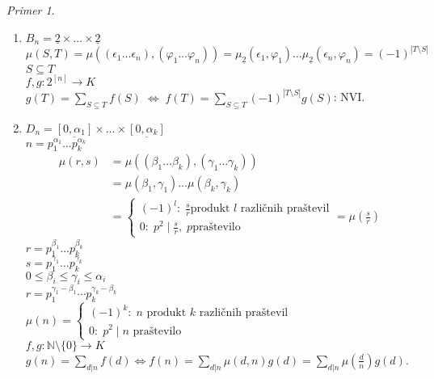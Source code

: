 \documentclass[a4paper, 12pt]{book}
\theoremstyle{definition}
\theoremstyle{remark}
\newtheorem*{ex}{Primer}
\newcommand{\N}{\mathbb{N}}
\begin{document}
\begin{ex} \text{}
  \begin{enumerate}[label=(\arabic*)]
    \item $B_n = \underline{2} \times \dots \times \underline{2}$ \\
      $\mu(S, T) = \mu((\epsilon_1 \dots \epsilon_n), (\varphi_1 \dots \varphi_n))
        = \mu_{\underline{2}}(\epsilon_1, \varphi_1) \dots \mu_{\underline{2}}(\epsilon_n, \varphi_n)
        = (-1)^{|T \setminus S|}$ \\
      $S \subseteq T$ \\
      $f, g: 2^{[n]} \to K$ \\
      $g(T) = \sum_{S \subseteq T} f(S) \; \iff \;
      f(T) = \sum_{S \subseteq T} (-1)^{|T \setminus S|} g(S)$: NVI.
    \item $D_n = \underline{[0, \alpha_1]} \times \dots \times \underline{[0, \alpha_k]}$ \\
      $n = p_1^{\alpha_1} \dots p_k^{\alpha_k}$
      \begin{align*}
        \mu(r,s) &= \mu((\beta_1 \dots \beta_k), (\gamma_1 \dots \gamma_k)) \\
        &= \mu(\beta_1, \gamma_1) \dots \mu(\beta_k, \gamma_k) \\
        &= \begin{cases}
          (-1)^l: \; \frac{s}{r} \text{produkt $l$ različnih praštevil} \\
          0: \; p^2 \mid \frac{s}{r}, \; p \text{praštevilo}
        \end{cases} = \mu\left(\frac{s}{r}\right)
      \end{align*}
      $r = p_1^{\beta_1} \dots p_k^{\beta_k}$ \\
      $s = p_1^{\gamma_1} \dots p_k^{\gamma_k}$ \\
      $0 \leq \beta_i \leq \gamma_i \leq \alpha_i$ \\
      $r = p_1^{\gamma_1 - \beta_1} \cdots p_k^{\gamma_k - \beta_k}$ \\
      $\mu(n) = \begin{cases}
        (-1)^k: \; n \text{ produkt $k$ različnih praštevil} \\
        0: \; p^2 \mid n \text{ praštevilo}
      \end{cases}$ \\
      $f, g: \N \setminus \{0\} \to K$ \\
      $g(n) = \sum_{d | n} f(d) \iff
      f(n) = \sum_{d | n} \mu(d,n) g(d) = \sum_{d | n} \mu\left(\frac{d}{n}\right) g(d)$.
  \end{enumerate}
\end{ex}



%
%



\end{document}
